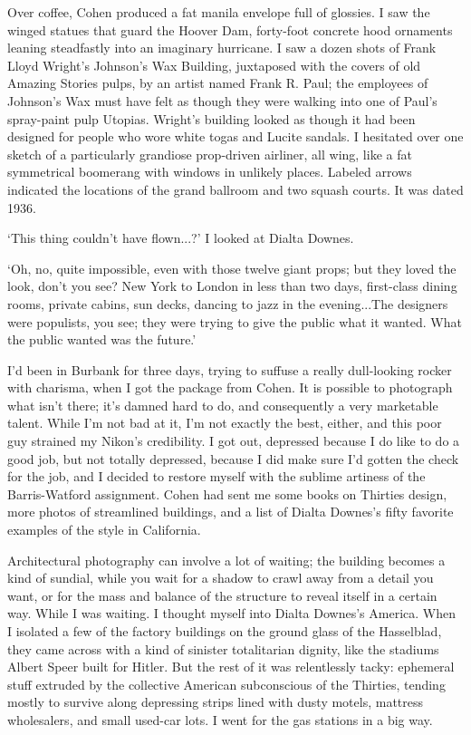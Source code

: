 Over coffee, Cohen produced a fat manila envelope full of glossies. I saw the winged statues that guard the Hoover Dam, forty-foot concrete hood ornaments leaning steadfastly into an imaginary hurricane. I saw a dozen shots of Frank Lloyd Wright's Johnson's Wax Building, juxtaposed with the covers of old Amazing Stories pulps, by an artist named Frank R. Paul; the employees of Johnson's Wax must have felt as though they were walking into one of Paul's spray-paint pulp Utopias. Wright's building looked as though it had been designed for people who wore white togas and Lucite sandals. I hesitated over one sketch of a particularly grandiose prop-driven airliner, all wing, like a fat symmetrical boomerang with windows in unlikely places. Labeled arrows indicated the locations of the grand ballroom and two squash courts. It was dated 1936.

`This thing couldn't have flown...?' I looked at Dialta Downes.

`Oh, no, quite impossible, even with those twelve giant props; but they loved the look, don't you see? New York to London in less than two days, first-class dining rooms, private cabins, sun decks, dancing to jazz in the evening...The designers were populists, you see; they were trying to give the public what it wanted. What the public wanted was the future.'

I'd been in Burbank for three days, trying to suffuse a really dull-looking rocker with charisma, when I got the package from Cohen. It is possible to photograph what isn't there; it's damned hard to do, and consequently a very marketable talent. While I'm not bad at it, I'm not exactly the best, either, and this poor guy strained my Nikon's credibility. I got out, depressed because I do like to do a good job, but not totally depressed, because I did make sure I'd gotten the check for the job, and I decided to restore myself with the sublime artiness of the Barris-Watford assignment. Cohen had sent me some books on Thirties design, more photos of streamlined buildings, and a list of Dialta Downes's fifty favorite examples of the style in California.

Architectural photography can involve a lot of waiting; the building becomes a kind of sundial, while you wait for a shadow to crawl away from a detail you want, or for the mass and balance of the structure to reveal itself in a certain way. While I was waiting. I thought myself into Dialta Downes's America. When I isolated a few of the factory buildings on the ground glass of the Hasselblad, they came across with a kind of sinister totalitarian dignity, like the stadiums Albert Speer built for Hitler. But the rest of it was relentlessly tacky: ephemeral stuff extruded by the collective American subconscious of the Thirties, tending mostly to survive along depressing strips lined with dusty motels, mattress wholesalers, and small used-car lots. I went for the gas stations in a big way.

